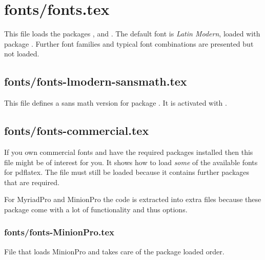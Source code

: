 \section{fonts/fonts.tex}

This file loads the packages ,  and
. The default font is \emph{Latin Modern}, loaded with package . Further font families and typical font combinations 
are presented but not loaded.


\subsection{fonts/fonts-lmodern-sansmath.tex}

This file defines a sans math version for package . 
It is activated with .


\subsection{fonts/fonts-commercial.tex}
If you own commercial fonts and have the required \latex packages installed then this file might be of interest for you. It shows how to load \emph{some} of the available fonts for pdflatex. The file  must still be loaded because it contains further packages that are required.

For MyriadPro and MinionPro the code is extracted into extra files %
because these package come with a lot of functionality and thus options.


\subsubsection{fonts/fonts-MinionPro.tex}
File that loads MinionPro and takes care of the package loaded order.

